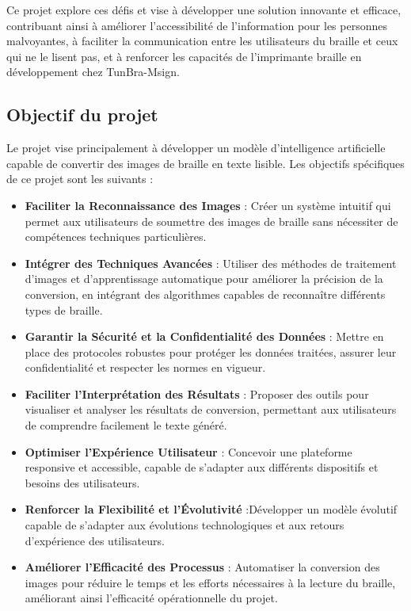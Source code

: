Ce projet explore ces défis et vise à développer une solution innovante et efficace, contribuant ainsi à améliorer l'accessibilité de l'information pour les personnes malvoyantes, à faciliter la communication entre les utilisateurs du braille et ceux qui ne le lisent pas, et à renforcer les capacités de l'imprimante braille en développement chez TunBra-Msign.

 


\subsection{Objectif du projet}

Le projet vise principalement à développer un modèle d'intelligence artificielle capable de convertir des images de braille en texte lisible. Les objectifs spécifiques de ce projet sont les suivants : 

\begin{itemize}
    \item \textbf{Faciliter la Reconnaissance des Images } : Créer un système intuitif qui permet aux utilisateurs de soumettre des images de braille sans nécessiter de compétences techniques particulières. 
    \item \textbf{Intégrer des Techniques Avancées } : Utiliser des méthodes de traitement d'images et d'apprentissage automatique pour améliorer la précision de la conversion, en intégrant des algorithmes capables de reconnaître différents types de braille.  
    \item \textbf{Garantir la Sécurité et la Confidentialité des Données } : Mettre en place des protocoles robustes pour protéger les données traitées, assurer leur confidentialité et respecter les normes en vigueur. 
    \item \textbf{Faciliter l'Interprétation des Résultats } : Proposer des outils pour visualiser et analyser les résultats de conversion, permettant aux utilisateurs de comprendre facilement le texte généré. 
    \item \textbf{Optimiser l'Expérience Utilisateur } : Concevoir une plateforme responsive et accessible, capable de s'adapter aux différents dispositifs et besoins des utilisateurs.
    \item \textbf{Renforcer la Flexibilité et l'Évolutivité} :Développer un modèle évolutif capable de s'adapter aux évolutions technologiques et aux retours d'expérience des utilisateurs.
    \item \textbf{Améliorer l'Efficacité des Processus } : Automatiser la conversion des images pour réduire le temps et les efforts nécessaires à la lecture du braille, améliorant ainsi l'efficacité opérationnelle du projet.  
\end{itemize}

